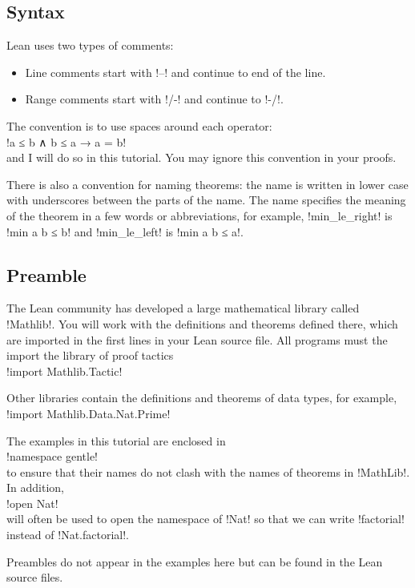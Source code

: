 \subsection*{Syntax}

Lean uses two types of comments: 
\begin{itemize}
\item Line comments start with !--! and continue to end of the line.
\item Range comments start with !/-! and continue to !-/!.
\end{itemize}

The convention is to use spaces around each operator:\\
\indnt{}!a ≤ b ∧ b ≤ a → a = b!\\
and I will do so in this tutorial. You may ignore this convention in your proofs.

There is also a convention for naming theorems: the name is written in lower case with underscores between the parts of the name. The name specifies the meaning of the theorem in a few words or abbreviations, for example, !min_le_right! is !min a b ≤ b! and !min_le_left! is !min a b ≤ a!.

\subsection*{Preamble}

The Lean community has developed a large mathematical library called !Mathlib!. You will work with the definitions and theorems defined there, which are imported in the first lines in your Lean source file. All programs must the import the library of proof tactics\\
\indnt{}!import Mathlib.Tactic!

Other libraries contain the definitions and theorems of data types, for example,\\
\indnt{}!import Mathlib.Data.Nat.Prime!

The examples in this tutorial are enclosed in\\
\indnt{}!namespace gentle!\\
to ensure that their names do not clash with the names of theorems in !MathLib!. In addition,\\
\indnt{}!open Nat!\\
will often be used to open the namespace of !Nat! so that we can write !factorial! instead of !Nat.factorial!.

Preambles do not appear in the examples here but can be found in the Lean source files.

